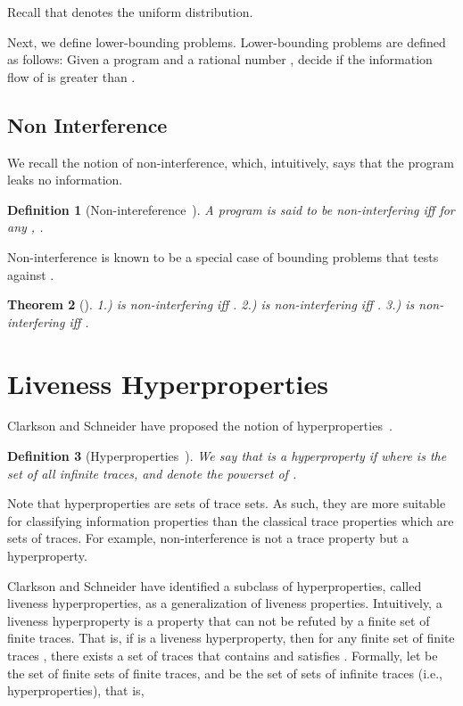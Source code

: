 \documentclass[]{eptcs}
\newtheorem{theorem}{Theorem}[section]
\newtheorem{definition}[theorem]{Definition}
\begin{document}
Recall that  denotes the uniform distribution.

Next, we define lower-bounding problems.  Lower-bounding problems are
defined as follows: Given a program  and a rational number ,
decide if the information flow of  is greater than .


\subsection{Non Interference}

We recall the notion of non-interference, which, intuitively, says that
the program leaks no information.
\begin{definition}[Non-intereference~\cite{DBLP:conf/sosp/Cohen77,goguen:sp1982}]
  A program  is said to be non-interfering iff for any , .
\end{definition}

Non-interference is known to be a special case of bounding problems that
tests against .
\begin{theorem}[\cite{clark05,DBLP:conf/esorics/YasuokaT10}]
\label{thm:nonint}
1.)  is non-interfering iff .
2.)  is non-interfering iff .
3.)  is non-interfering iff .
\end{theorem}

\section{Liveness Hyperproperties}

Clarkson and Schneider have proposed the notion of
hyperproperties~\cite{DBLP:journals/jcs/ClarksonS10}.  
\begin{definition}[Hyperproperties~\cite{DBLP:journals/jcs/ClarksonS10}]
  We say that  is a hyperproperty if  where  is the set of
  all infinite traces, and  denote the powerset of
  .
\end{definition}
Note that hyperproperties are sets of trace sets.  As such, they are
more suitable for classifying information properties than the
classical trace properties which are sets of traces.  For example,
non-interference is not a trace property but a hyperproperty.

Clarkson and Schneider have identified a subclass of hyperproperties,
called liveness hyperproperties, as a generalization of liveness
properties.  Intuitively, a liveness hyperproperty is a property that
can not be refuted by a finite set of finite traces.  That is, if 
is a liveness hyperproperty, then for any finite set of finite traces
, there exists a set of traces that contains  and satisfies .
Formally, let  be the set of finite sets of finite traces,
and  be the set of sets of infinite traces (i.e.,
hyperproperties), that is,
\end{document}
